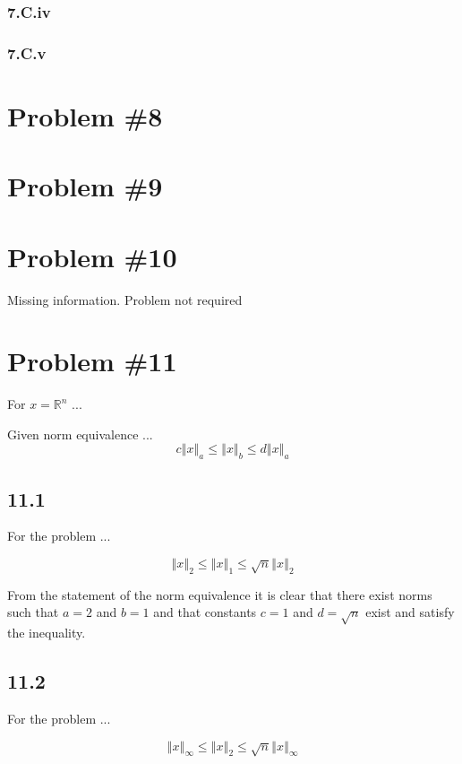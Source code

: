 \documentclass[12px]{article}
\newcommand{\R}{\mathbb{R}}
\begin{document}
\subsubsection*{7.C.iv}
\subsubsection*{7.C.v}



\section{Problem \#8}

\section{Problem \#9}

\section{Problem \#10}

Missing information. Problem not required

\section{Problem \#11}

For $x = \R^{n}$ ...

\noindent Given norm equivalence ...
$$ c\left\Vert x \right\Vert_{a} \leq \left\Vert x \right\Vert_{b} \leq d \left\Vert x \right\Vert_{a} $$

\subsection*{11.1}
For the problem ...

$$ \left\Vert x \right\Vert_{2} \leq \left\Vert x \right\Vert_{1} \leq \sqrt{n} \left\Vert x \right\Vert_{2} $$

\noindent From the statement of the norm equivalence it is clear that there exist norms such that $a=2$ and $b=1$ and that constants $c=1$ and $d=\sqrt{n}$ exist and satisfy the inequality.

\subsection*{11.2}

For the problem ...

$$ \left\Vert x \right\Vert_{\infty} \leq \left\Vert x \right\Vert_{2} \leq \sqrt{n} \left\Vert x \right\Vert_{\infty} $$
\end{document}
